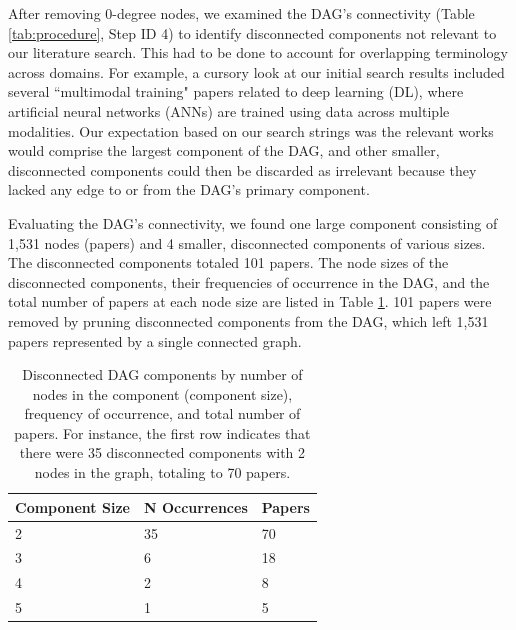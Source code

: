 \documentclass[manuscript,screen,review]{acmart}
\begin{document}
After removing 0-degree nodes, we examined the DAG's connectivity (Table \ref{tab:procedure}, Step ID 4) to identify disconnected components not relevant to our literature search. This had to be done to account for overlapping terminology across domains. For example, a cursory look at our initial search results included several ``multimodal training" papers related to deep learning (DL), where artificial neural networks (ANNs) are trained using data across multiple modalities. Our expectation based on our search strings was the relevant works would comprise the largest component of the DAG, and other smaller, disconnected components could then be discarded as irrelevant because they lacked any edge to or from the DAG's primary component.

Evaluating the DAG's connectivity, we found one large component consisting of 1,531 nodes (papers) and 4 smaller, disconnected components of various sizes. The disconnected components totaled 101 papers. The node sizes of the disconnected components, their frequencies of occurrence in the DAG, and the total number of papers at each node size are listed in Table \ref{tab:disconnected}. 101 papers were removed by pruning disconnected components from the DAG, which left 1,531 papers represented by a single connected graph. 

\begin{table}[htbp]
    \renewcommand{\arraystretch}{1.3}%
    \centering
    \caption{Disconnected DAG components by number of nodes in the component (component size), frequency of occurrence, and total number of papers. For instance, the first row indicates that there were 35 disconnected components with 2 nodes in the graph, totaling to 70 papers.}
    \begin{tabularx}{0.5\linewidth}{l@{\hskip .25in} l@{\hskip .25in} l@{\hskip .25in}}
        Component Size & N Occurrences & Papers \\
        \midrule
        
        2    &  35 &  70\\
        \midrule
        
        3    &  6  &  18\\
        \midrule
        
        4    &  2  &  8\\
        \midrule
        
        5    &  1  &  5\\

        \bottomrule
    \end{tabularx}
    \label{tab:disconnected}
\end{table}
\end{document}
